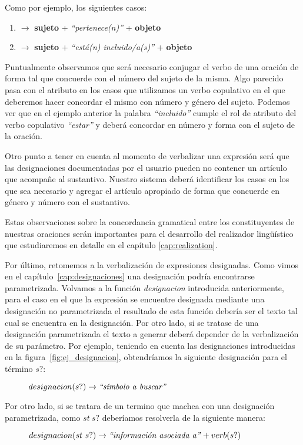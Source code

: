 \noindent
Como por ejemplo, los siguientes casos:

\bigskip
\begin{enumerate}
 \item {} $\rightarrow$ \textbf{sujeto} + \emph{``pertenece(n)''} + \textbf{objeto}
 \item {} $\rightarrow$ \textbf{sujeto} + \emph{``está(n) incluido/a(s)''} + \textbf{objeto}
\end{enumerate}

\bigskip
Puntualmente observamos que será necesario conjugar el verbo de una oración de forma tal que concuerde con el número del sujeto de la misma. Algo parecido pasa con el atributo en los casos que utilizamos un verbo copulativo en el que deberemos hacer concordar el mismo con número y género del sujeto. Podemos ver que en el ejemplo anterior la palabra \emph{``incluido''} cumple el rol de atributo del verbo copulativo \emph{``estar''} y deberá concordar en número y forma con el sujeto de la oración. 

Otro punto a tener en cuenta al momento de verbalizar una expresión será que las designaciones documentadas por el usuario pueden no contener un artículo que acompañe al sustantivo. Nuestro sistema deberá identificar los casos en los que sea necesario y agregar el artículo apropiado de forma que concuerde en género y número con el sustantivo. 

Estas observaciones sobre la concordancia gramatical entre los constituyentes de nuestras oraciones serán importantes para el desarrollo del realizador lingüístico que estudiaremos en detalle en el capítulo \ref{cap:realization}.

Por último, retomemos a la verbalización de expresiones designadas. Como vimos en el capítulo~\ref{cap:designaciones} una designación podría encontrarse parametrizada. Volvamos a la función \emph{designacion} introducida anteriormente, para el caso en el que la expresión se encuentre designada mediante una designación no parametrizada el resultado de esta función debería ser el texto tal cual se encuentra en la designación. Por otro lado, si se tratase de una designación parametrizada el texto a generar deberá depender de la verbalización de su parámetro. Por ejemplo, teniendo en cuenta las designaciones introducidas en la figura~\ref{fig:ej_designacion}, obtendríamos la siguiente designación para el término $s?$:

\begin{figure}[H]
\center
$designacion(s?) \rightarrow \text{\emph{``símbolo a buscar''}}$
\end{figure}

\noindent
Por otro lado, si se tratara de un termino que machea con una designación parametrizada, como $st~s?$ deberíamos resolverla de la siguiente manera: 

\begin{figure}[H]
\center
$designacion(st~s?) \rightarrow \text{\emph{``información asociada a''}} + verb(s?)$
\end{figure}



